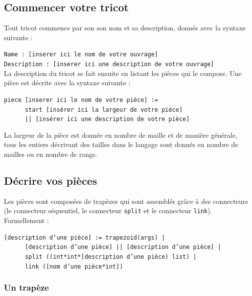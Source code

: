\documentclass[a4paper,10pt]{article}
\begin{document}
  \subsection{Commencer votre tricot}
  
Tout tricot commence par son son nom et sa description, donnés avec la syntaxe suivante :

\noindent \texttt{Name : [inserer ici le nom de votre ouvrage] \\
  Description : [inserer ici une description de votre ouvrage]} \\

La description du tricot se fait ensuite en listant les pièces qui le compose. Une pièce est décrite avec la syntaxe suivante :

\noindent \texttt{piece [inserer ici le nom de votre pièce] := \\
  \textcolor{white}{alinea}start [insérer ici la largeur de votre pièce] \\
  \textcolor{white}{alinea}|| [insérer ici une description de votre pièce]}
  
La largeur de la pièce est donnée en nombre de maille et de manière générale, tous les entiers décrivant des tailles dans le langage sont donnés en nombre de mailles ou en nombre de rangs.

  \subsection{Décrire vos pièces}
  
  Les pièces sont composées de trapèzes qui sont assemblés grâce à des connecteurs (le connecteur séquentiel, le connecteur \texttt{split} et le connecteur \texttt{link}). Formellement :
  
\noindent \texttt{[description d'une pièce] := trapezoid(args) | \\
  \textcolor{white}{alinea}[description d'une pièce] || [description d'une pièce] | \\
  \textcolor{white}{alinea}split ((int*int*[description d'une pièce) list) | \\
  \textcolor{white}{alinea}link ([nom d'une pièce*int])}

\subsubsection{Un trapèze}
\end{document}
